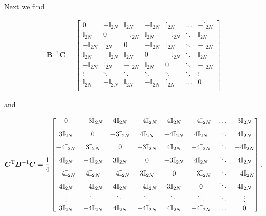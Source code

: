 \documentclass{article}
\begin{document}
Next we find

\begin{align}
	\boldsymbol{B}^{-1}\boldsymbol{C} = \begin{bmatrix}
		0 & -\mathbb{I}_{2N} & \mathbb{I}_{2N} & -\mathbb{I}_{2N} & \mathbb{I}_{2N} & \dots & -\mathbb{I}_{2N} \\
		\mathbb{I}_{2N} & 0 & -\mathbb{I}_{2N} & \mathbb{I}_{2N} &-\mathbb{I}_{2N} & \ddots & \mathbb{I}_{2N} \\
		-\mathbb{I}_{2N} & \mathbb{I}_{2N} & 0 & -\mathbb{I}_{2N} & \mathbb{I}_{2N} & \ddots & -\mathbb{I}_{2N} \\
		\mathbb{I}_{2N} & -\mathbb{I}_{2N} & \mathbb{I}_{2N} & 0 & -\mathbb{I}_{2N} & \ddots & \mathbb{I}_{2N} \\
		-\mathbb{I}_{2N} & \mathbb{I}_{2N} & -\mathbb{I}_{2N} & \mathbb{I}_{2N} & 0 & \ddots & -\mathbb{I}_{2N} \\
		\vdots &\ddots & \ddots &\ddots & \ddots & \ddots & \vdots \\
		\mathbb{I}_{2N} & -\mathbb{I}_{2N} & \mathbb{I}_{2N} & -\mathbb{I}_{2N} & \mathbb{I}_{2N} & \dots & 0 \\
	\end{bmatrix}
\end{align}

and

\begin{align}
	\boldsymbol{C}^{\mathrm{T}  }\boldsymbol{B}^{-1}\boldsymbol{C} = \frac{1}{4}\begin{bmatrix}
		0 & -3\mathbb{I}_{2N} & 4\mathbb{I}_{2N} & -4\mathbb{I}_{2N} & 4\mathbb{I}_{2N} & -4\mathbb{I}_{2N} & \dots & \-3\mathbb{I}_{2N}\\
		3\mathbb{I}_{2N} & 0 & -3\mathbb{I}_{2N} & 4\mathbb{I}_{2N} & -4\mathbb{I}_{2N} & 4\mathbb{I}_{2N} & \ddots & 4\mathbb{I}_{2N}\\
		-4\mathbb{I}_{2N} & 3\mathbb{I}_{2N} & 0 & -3\mathbb{I}_{2N} & 4\mathbb{I}_{2N} & -4\mathbb{I}_{2N} & \ddots & -4\mathbb{I}_{2N}\\
		4\mathbb{I}_{2N} & -4\mathbb{I}_{2N} & 3\mathbb{I}_{2N} & 0 & -3\mathbb{I}_{2N} & 4\mathbb{I}_{2N} & \ddots & 4\mathbb{I}_{2N}\\
		-4\mathbb{I}_{2N} & 4\mathbb{I}_{2N} & -4\mathbb{I}_{2N} & 3\mathbb{I}_{2N} & 0 & -3\mathbb{I}_{2N} & \ddots & -4\mathbb{I}_{2N}\\
		4\mathbb{I}_{2N} & -4\mathbb{I}_{2N} & 4\mathbb{I}_{2N} & -4\mathbb{I}_{2N} & 3\mathbb{I}_{2N} & 0 & \ddots & 4\mathbb{I}_{2N}\\
		    \vdots      & \ddots           & \ddots            & \ddots          & \ddots             & \ddots           & \ddots & \vdots\\
		3\mathbb{I}_{2N} & -4\mathbb{I}_{2N} & 4\mathbb{I}_{2N} & -4\mathbb{I}_{2N} & 4\mathbb{I}_{2N} & -4\mathbb{I}_{2N} & \dots & 0\\
	\end{bmatrix}.
\end{align}
\end{document}
